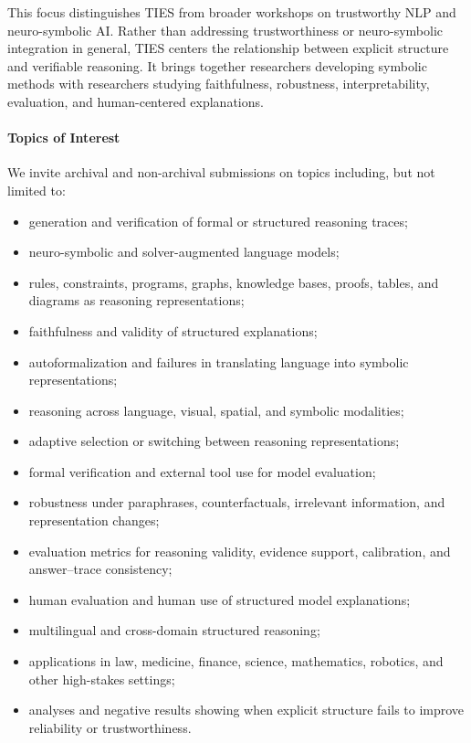 \documentclass[11pt]{article}
\begin{document}
This focus distinguishes TIES from broader workshops on trustworthy NLP
and neuro-symbolic AI. Rather than addressing trustworthiness or
neuro-symbolic integration in general, TIES centers the relationship
between explicit structure and verifiable reasoning. It brings together
researchers developing symbolic methods with researchers studying
faithfulness, robustness, interpretability, evaluation, and
human-centered explanations.

\paragraph{Topics of Interest}

We invite archival and non-archival submissions on topics including, but
not limited to:

\begin{itemize}[leftmargin=12pt,noitemsep,topsep=1pt]
    \item generation and verification of formal or structured reasoning traces;
    \item neuro-symbolic and solver-augmented language models;
    \item rules, constraints, programs, graphs, knowledge bases, proofs, tables, and diagrams as reasoning representations;
    \item faithfulness and validity of structured explanations;
    \item autoformalization and failures in translating language into symbolic representations;
    \item reasoning across language, visual, spatial, and symbolic modalities;
    \item adaptive selection or switching between reasoning representations;
    \item formal verification and external tool use for model evaluation;
    \item robustness under paraphrases, counterfactuals, irrelevant information, and representation changes;
    \item evaluation metrics for reasoning validity, evidence support, calibration, and answer--trace consistency;
    \item human evaluation and human use of structured model explanations;
    \item multilingual and cross-domain structured reasoning;
    \item applications in law, medicine, finance, science, mathematics, robotics, and other high-stakes settings;
    \item analyses and negative results showing when explicit structure fails to improve reliability or trustworthiness.
\end{itemize}
\end{document}
